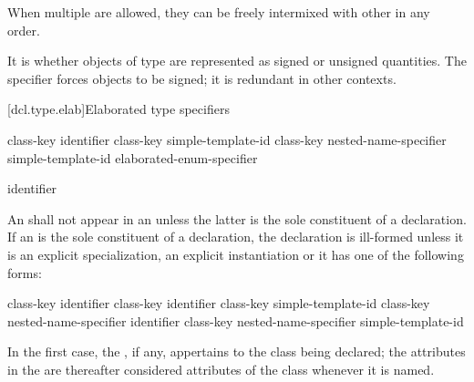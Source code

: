 \pnum
When multiple  are allowed, they can be
freely intermixed with other  in any order.
\begin{note}
It is  whether objects of  type are
represented as signed or unsigned quantities. The  specifier
forces  objects to be signed; it is redundant in other contexts.
\end{note}

[dcl.type.elab]{Elaborated type specifiers}%
%
%

\begin{bnf}
\br
    class-key   identifier\br
    class-key simple-template-id\br
    class-key nested-name-specifier  simple-template-id\br
    elaborated-enum-specifier
\end{bnf}

\begin{bnf}
\br
      identifier
\end{bnf}

\pnum
{}%
%
An  shall not appear in an 
unless the latter is the sole constituent of a declaration.
If an  is the sole constituent of a
declaration, the declaration is ill-formed unless it is an explicit
specialization, an explicit
instantiation or it has one of the following
forms:

\begin{ncsimplebnf}
class-key  identifier \terminal{;}\br
{} class-key \terminal{\opt{::}} identifier \terminal{;}\br
{} class-key \terminal{\opt{::}} simple-template-id \terminal{;}\br
{} class-key nested-name-specifier identifier \terminal{;}\br
{} class-key nested-name-specifier  simple-template-id \terminal{;}
\end{ncsimplebnf}

In the first case, the , if any, appertains
to the class being declared; the attributes in the
 are thereafter considered attributes of
the class whenever it is named.

